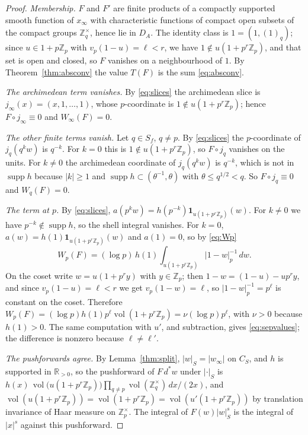 \documentclass[11pt]{amsart}
\theoremstyle{definition}
\theoremstyle{remark}
\newcommand{\R}{\mathbb R}
\newcommand{\Z}{\mathbb Z}
\newcommand{\dstar}{\,d^{*}}
\newcommand{\supp}{\operatorname{supp}}
\newcommand{\vol}{\operatorname{vol}}
\newcommand{\DA}{D_A}
\begin{document}
\begin{proof}
\emph{Membership.}  $F$ and $F'$ are finite products of a compactly supported
smooth function of $x_{\infty}$ with characteristic functions of compact open
subsets of the compact groups $\Z_q^{\times}$, hence lie in $\DA$.  The
identity class is $1=(1,(1)_q)$; since $u\in1+p\Z_p$ with $v_p(1-u)=\ell<r$, we
have $1\notin u(1+p^{r}\Z_p)$, and that set is open and closed, so $F$ vanishes
on a neighbourhood of $1$.  By Theorem~\ref{thm:absconv} the value $T(F)$ is
the sum \eqref{eq:absconv}.

\emph{The archimedean term vanishes.}  By \eqref{eq:slices} the archimedean
slice is $j_{\infty}(x)=(x,1,\dots,1)$, whose $p$-coordinate is
$1\notin u(1+p^{r}\Z_p)$; hence $F\circ j_{\infty}\equiv0$ and $W_{\infty}(F)=0$.

\emph{The other finite terms vanish.}  Let $q\in S_f$, $q\ne p$.  By
\eqref{eq:slices} the $p$-coordinate of $j_q(q^{k}w)$ is $q^{-k}$.  For $k=0$
this is $1\notin u(1+p^{r}\Z_p)$, so $F\circ j_q$ vanishes on the units.  For
$k\ne0$ the archimedean coordinate of $j_q(q^kw)$ is $q^{-k}$, which is not in $\supp h$
because $|k|\ge1$ and $\supp h\subset(\theta^{-1},\theta)$ with
$\theta\le q^{1/2}<q$.  So $F\circ j_q\equiv0$ and $W_q(F)=0$.

\emph{The term at $p$.}  By \eqref{eq:slices},
$a(p^{k}w)=h(p^{-k})\mathbf 1_{u(1+p^{r}\Z_p)}(w)$.  For $k\ne0$ we have
$p^{-k}\notin\supp h$, so the shell integral vanishes.  For $k=0$,
$a(w)=h(1)\mathbf 1_{u(1+p^{r}\Z_p)}(w)$ and $a(1)=0$, so by \eqref{eq:Wp}
\[
W_p(F)=(\log p)\,h(1)\int_{u(1+p^{r}\Z_p)}|1-w|_p^{-1}\,dw .
\]
On the coset write $w=u(1+p^{r}y)$ with $y\in\Z_p$; then $1-w=(1-u)-up^{r}y$,
and since $v_p(1-u)=\ell<r$ we get $v_p(1-w)=\ell$, so $|1-w|_p^{-1}=p^{\ell}$
is constant on the coset.  Therefore
$W_p(F)=(\log p)h(1)p^{\ell}\vol(1+p^{r}\Z_p)=\nu(\log p)p^{\ell}$, with $\nu>0$
because $h(1)>0$.  The same computation with $u'$, and subtraction, gives
\eqref{eq:sepvalues}; the difference is nonzero because $\ell\ne \ell'$.

\emph{The pushforwards agree.}  By Lemma~\ref{thm:split}, $|w|_S=|w_\infty|$
on $C_S$, and $h$ is supported in $\R_{>0}$, so the pushforward of
$F\dstar w$ under $|\cdot|_S$ is
$h(x)\,\vol\bigl(u(1+p^{r}\Z_p)\bigr)\prod_{q\ne p}\vol(\Z_q^{\times})\,
dx/(2x)$, and $\vol(u(1+p^{r}\Z_p))=\vol(1+p^{r}\Z_p)=\vol(u'(1+p^{r}\Z_p))$ by
translation invariance of Haar measure on $\Z_p^{\times}$.  The integral of
$F(w)|w|_S^{s}$ is the integral of $|x|^{s}$ against this pushforward.
\end{proof}
\end{document}
